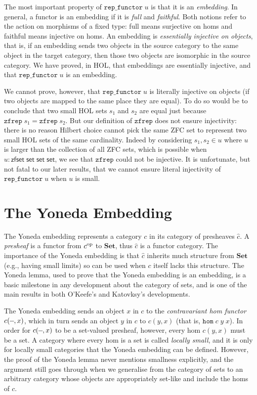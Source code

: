 \documentclass[twoside,titlepage,11pt]{article}
\begin{document}
The most important property of $\mathtt{rep\_functor}\;u$ is that it is an \emph{embedding}.
In general, a functor is an embedding if it is \emph{full} and \emph{faithful}.
Both notions refer to the action on morphisms of a fixed type: full means surjective on homs and faithful means injective on homs.
An embedding is \emph{essentially injective on objects}, that is, if an embedding sends two objects in the source category to the same object in the target category, then those two objects are isomorphic in the source category.
We have proved, in HOL, that embeddings are essentially injective, and that $\mathtt{rep\_functor}\;u$ is an embedding.

We cannot prove, however, that $\mathtt{rep\_functor}\;u$ is literally injective on objects (if two objects are mapped to the same place they are equal).
To do so would be to conclude that two small HOL sets $s_1$ and $s_2$ are equal just because $\mathtt{zfrep}\;s_1=\mathtt{zfrep}\;s_2$.
But our definition of $\mathtt{zfrep}$ does not ensure injectivity: there is no reason Hilbert choice cannot pick the same ZFC set to represent two small HOL sets of the same cardinality.
Indeed by considering $s_1,s_2\in u$ where $u$ is larger than the collection of all ZFC sets, which is possible when $u:\mathsf{zfset}\;\mathsf{set}\;\mathsf{set}\;\mathsf{set}$, we see that $\mathtt{zfrep}$ could not be injective.
It is unfortunate, but not fatal to our later results, that we cannot ensure literal injectivity of $\mathtt{rep\_functor}\;u$ when $u$ is small.
\section{The Yoneda Embedding}%
\label{Yoneda}
\newcommand{\op}{\ensuremath{\sp{\mathrm{op}}}}
\newcommand{\blank}{\rule[0.5ex]{0.6em}{.4pt}}
The Yoneda embedding represents a category $c$ in its category of presheaves $\widehat{c}$.
A \emph{presheaf} is a functor from ${c}\op$ to $\mathbf{Set}$, thus $\widehat{c}$ is a functor category.
The importance of the Yoneda embedding is that $\widehat{c}$ inherits much structure from $\mathbf{Set}$ (e.g., having small limits) so can be used when $c$ itself lacks this structure.
The Yoneda lemma, used to prove that the Yoneda embedding is an embedding, is a basic milestone in any development about the category of sets, and is one of the main results in both O'Keefe's and Katovksy's developments.

The Yoneda embedding sends an object $x$ in $c$ to the \emph{contravariant hom functor} $c(\blank,x)$, which in turn sends an object $y$ in $c$ to $c(y,x)$ (that is, $\mathtt{hom}\;c\;y\;x$).
In order for $c(\blank,x)$ to be a set-valued presheaf, however, every hom $c(y,x)$ must be a set.
A category where every hom is a set is called \emph{locally small}, and it is only for locally small categories that the Yoneda embedding can be defined.
However, the proof of the Yoneda lemma never mentions smallness explicitly, and the argument still goes through when we generalise from the category of sets to an arbitrary category whose objects are appropriately set-like and include the homs of $c$.
\end{document}

